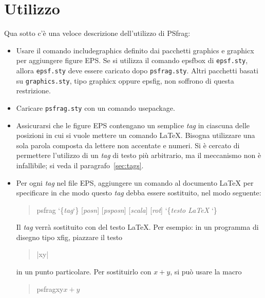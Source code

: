 \documentclass[a4paper,11pt]{ltxguide}
\let\pkg\textsf
\let\fname\texttt
\newcommand{\pfg}{\pkg{PSfrag}}
\def\cs#1{%
  {\ttfamily\expandafter\string\csname #1\endcsname}}
\providecommand\marg[1]{%
  {\ttfamily\char`\{}{\em#1\/}{\ttfamily\char`\}}}
\providecommand\oarg[1]{%
  {\ttfamily[}{\em #1\/}{\ttfamily]}}
\begin{document}
\section{Utilizzo}
Qua sotto c'\`e una veloce descrizione dell'utilizzo di \pfg{}:
\begin{itemize}
  
\item Usare il comando \cs{includegraphics} definito dai pacchetti
  \pkg{graphics} e \pkg{graphicx} per aggiungere figure EPS. Se si
  utilizza il comando \cs{epsfbox} di \fname{epsf.sty}, allora
  \fname{epsf.sty} deve essere caricato dopo \fname{psfrag.sty}. Altri
  pacchetti basati su \fname{graphics.sty}, tipo \pkg{graphicx} oppure
  \pkg{epsfig}, non soffrono di questa restrizione.

\item Caricare \fname{psfrag.sty} con un comando \cs{usepackage}.
  
\item Assicurarsi che le figure EPS contengano un semplice \emph{tag}
  in ciascuna delle posizioni in cui si vuole mettere un comando
  \LaTeX{}. Bisogna utilizzare una sola parola composta da
  lettere non accentate e numeri. Si \`e cercato di permettere
  l'utilizzo di un \emph{tag} di testo pi\`u arbitrario, ma il
  meccanismo non \`e infallibile; si veda il paragrafo~\ref{sec:tags}.
%
  
\item Per ogni \emph{tag} nel file EPS, aggiungere un comando al
  documento \LaTeX{} per specificare in che modo questo \emph{tag}
  debba essere sostituito, nel modo seguente:
\begin{quote}
    \cs{psfrag}\marg{tag}\oarg{posn}\oarg{psposn}%
    \oarg{scala}\oarg{rot}\marg{testo \LaTeX{} }
\end{quote}

Il \emph{tag} verr\`a sostituito con del testo \LaTeX{}.
Per esempio: in un programma di disegno tipo \pkg{xfig}, piazzare
il testo
\begin{quote}
        |xy|
\end{quote}
in un punto particolare. Per sostituirlo con $x+y$, si pu\`o usare la macro 
\begin{quote}
            \cs{psfrag{xy}{$x+y$}}
\end{quote}

\end{itemize}
\end{document}
